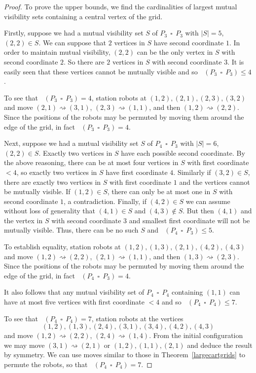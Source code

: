 \documentclass[10pt,a4paper]{amsart}
\DeclareMathOperator{\cmobmv}{Mob^*_{\mu}}
\DeclareMathOperator{\cp}{\,\square\,}
\DeclareMathOperator{\mobmv}{Mob_{\mu}}
\newcommand{\move}{\rightsquigarrow}
\begin{document}
	\begin{proof}
		To prove the upper bounds, we find the cardinalities of largest mutual visibility sets containing a central vertex of the grid.
		
		Firstly, suppose we had a mutual visibility set $S$ of $P_3 \cp P_3$ with $|S| = 5$, $(2,2) \in S$. We can suppose that $2$ vertices in $S$ have second coordinate $1$. In order to maintain mutual visibility, $(2,2)$ can be the only vertex in $S$ with second coordinate $2$. So there are $2$ vertices in $S$ with second coordinate $3$. It is easily seen that these vertices cannot be mutually visible and so $\mobmv(P_3 \cp P_3) \leq 4$.
		
		To see that $\mobmv(P_3 \cp P_3) = 4$, station robots at $(1,2), (2,1), (2,3), (3,2)$ and move $(2,1) \move (3,1)$, $(2,3) \move (1,1)$, and then $(1,2) \move (2,2)$. Since the positions of the robots may be permuted by moving them around the edge of the grid, in fact $\cmobmv(P_3 \cp P_3) = 4$.
		
		Next, suppose we had a mutual visibility set $S$ of $P_4 \cp P_3$ with $|S| = 6$, $(2,2) \in S$. Exactly two vertices in $S$ have each possible second coordinate. By the above reasoning, there can be at most four vertices in $S$ with first coordinate $<4$, so exactly two vertices in $S$ have first coordinate $4$. Similarly if $(3,2) \in S$, there are exactly two vertices in $S$ with first coordinate $1$ and the vertices cannot be mutually visible. If $(1,2) \in S$, there can only be at most one in $S$ with second coordinate $1$, a contradiction. Finally, if $(4,2) \in S$ we can assume without loss of generality that $(4,1) \in S$ and $(4,3) \notin S$. But then $(4,1)$ and the vertex in $S$ with second coordinate $3$ and smallest first coordinate will not be mutually visible. Thus, there can be no such $S$ and $\mobmv(P_4 \cp P_3) \leq 5$.
		
		To establish equality, station robots at $(1,2), (1,3), (2,1), (4,2), (4,3)$ and move $(1,2) \move (2,2)$, $(2,1) \move (1,1)$, and then $(1,3) \move (2,3)$. Since the positions of the robots may be permuted by moving them around the edge of the grid, in fact $\cmobmv(P_4 \cp P_3) = 4$.
		
		It also follows that any mutual visibility set of $P_4 \cp P_4$ containing $(1,1)$ can have at most five vertices with first coordinate $<4$ and so $\mobmv(P_4 \cp P_4) \leq 7$.
		
		To see that $\mobmv(P_4 \cp P_4) = 7$, station robots at the vertices \[ (1,2), (1,3), (2,4), (3,1), (3,4), (4,2), (4,3)\] and move $(1,2) \move (2,2)$, $(2,4) \move (1,4)$. From the initial configuration we may move $(3,1) \move (2,1)$ or $(1,2), (1,1), (2,1)$ and deduce the result by symmetry. We can use moves similar to those in Theorem~\ref{largecartgrids} to permute the robots, so that $\cmobmv(P_4 \cp P_4) = 7$.
		

\end{proof}
\end{document}
